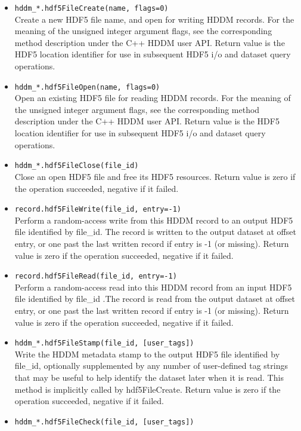 \documentclass{revtex4}
\begin{document}
\begin{itemize}
\item \texttt{hddm\_*.hdf5FileCreate(name, flags=0)}\\
Create a new HDF5 file name, and open for writing HDDM records. For the
meaning of the unsigned integer argument flags, see the corresponding method
description under the C++ HDDM user API. Return value is the HDF5 location
identifier for use in subsequent HDF5 i/o and dataset query operations.
\item \texttt{hddm\_*.hdf5FileOpen(name, flags=0)}\\
Open an existing HDF5 file for reading HDDM records. For the meaning of the
unsigned integer argument flags, see the corresponding method description under
the C++ HDDM user API. Return value is the HDF5 location identifier for use in
subsequent HDF5 i/o and dataset query operations.
\item \texttt{hddm\_*.hdf5FileClose(file\_id)}\\
Close an open HDF5 file and free its HDF5 resources. Return value is zero if
the operation succeeded, negative if it failed.
\item \texttt{record.hdf5FileWrite(file\_id, entry=-1)}\\
Perform a random-access write from this HDDM record to an output HDF5 file 
identified by file\_id. The record is written to the output dataset at offset
entry, or one past the last written record if entry is -1 (or missing). Return
value is zero if the operation succeeded, negative if it failed.
\item \texttt{record.hdf5FileRead(file\_id, entry=-1)}\\
Perform a random-access read into this HDDM record from an input HDF5 file
identified by file\_id .The record is read from the output dataset at offset
entry, or one past the last written record if entry is -1 (or missing). Return
value is zero if the operation succeeded, negative if it failed.
\item \texttt{hddm\_*.hdf5FileStamp(file\_id, [user\_tags])}\\
Write the HDDM metadata stamp to the output HDF5 file identified by file\_id,
optionally supplemented by any number of user-defined tag strings that may be
useful to help identify the dataset later when it is read. This method is
implicitly called by hdf5FileCreate. Return value is zero if the operation
succeeded, negative if it failed.
\item \texttt{hddm\_*.hdf5FileCheck(file\_id, [user\_tags])}\\

\end{itemize}
\end{document}
